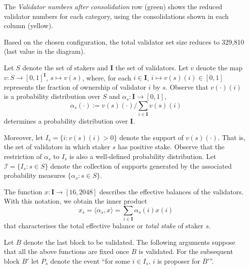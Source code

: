 \documentclass{article}
\newcommand{\eb}{x}
\newcommand{\mc}{\mathcal}
\begin{document}
The \emph{Validator numbers after consolidation} row (green) shows the reduced validator numbers for each category, using the consolidations shown in each column (yellow).

Based on the chosen configuration, the total validator set size reduces to 329,810 (last value in the diagram).


Let $S$ denote the set of stakers and $\mathbf I$ the set of validators. Let
$v$ denote the map $v: S \rightarrow [0, 1]^\mathbf I$, $s \mapsto v(s)$,
where, for each $i \in \mathbf I$, $i \mapsto v(s)(i) \in [0, 1]$ represents the
fraction of ownership of validator $i$ by $s$.
Observe that $v(\cdot)(i)$ is a probability distribution over $S$ and
$\alpha_s: \mathbf I \rightarrow [0, 1]$, 
\[\alpha_s (\cdot) := v(s)(\cdot) / \sum_{i \in \mathbf I} v(s)(i)\] 
determines a probability distribution over $\mathbf I$.

Moreover, let $I_s = \{i : v(s)(i) > 0\}$ denote the support of $v(s)(\cdot)$.
That is, the set of validators in which staker $s$ has positive stake. Observe
that the restriction of $\alpha_s$ to $I_s$ is also a well-defined probability
distribution. Let $\mc I = \{I_s : s \in S\}$ denote the collection
of supports generated by the associated probability measures $\{\alpha_s: s \in
S\}$.

The function $\eb : \mathbf I \rightarrow [16, 2048]$ describes the effective
balances of the validators.  With this notation, we obtain the inner product
\[\eb_s = \langle \alpha_s, \eb\rangle = \sum_{i \in \mathbf I} \alpha_s(i)\eb(i)\] 
that characterises the total effective balance or \emph{total stake} of staker $s$.

Let $B$ denote the last block to be validated. The following arguments suppose
that all the above functions are fixed once $B$ is validated. For the
subsequent block $B'$ let $P_s$ denote the event ``for some $i \in I_s$, $i$ is
proposer for $B'$''.
\end{document}
